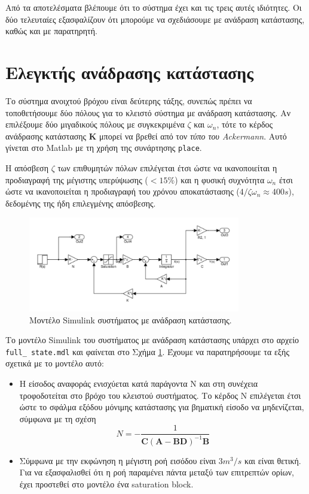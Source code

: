 \documentclass[a4paper, 11pt, english, greek]{article}
\begin{document}
Από τα αποτελέσματα βλέπουμε ότι το σύστημα έχει και τις τρεις αυτές ιδιότητες.
Οι δύο τελευταίες εξασφαλίζουν ότι μπορούμε να σχεδιάσουμε με ανάδραση κατάστασης, καθώς και με παρατηρητή.

\section{Ελεγκτής ανάδρασης κατάστασης}
Το σύστημα ανοιχτού βρόχου είναι δεύτερης τάξης, συνεπώς πρέπει να τοποθετήσουμε δύο πόλους για το κλειστό
σύστημα με ανάδραση κατάστασης.
Αν επιλέξουμε δύο μιγαδικούς πόλους με συγκεκριμένα $\zeta$ και $ω_n$, τότε το κέρδος ανάδρασης κατάστασης $\mathbf{K}$
μπορεί να βρεθεί από τον \emph{τύπο του \textlatin{Ackermann}}.
Αυτό γίνεται στο \textlatin{Matlab} με τη χρήση της συνάρτησης \textlatin{\texttt{place}}.

Η απόσβεση $\zeta$ των επιθυμητών πόλων επιλέγεται έτσι ώστε να ικανοποιείται η προδιαγραφή της μέγιστης υπερύψωσης
($<15\%$) και η φυσική συχνότητα $ω_n$ έτσι ώστε να ικανοποιείται η προδιαγραφή του χρόνου αποκατάστασης
($4/\zeta ω_n\approx 400s$), δεδομένης της ήδη επιλεγμένης απόσβεσης.

\begin{figure}[htb]
  \centering
  \includegraphics[width=350px]{full_state}
  \caption{Μοντέλο \textlatin{Simulink} συστήματος με ανάδραση κατάστασης.}
  \label{fig:full_state}
\end{figure}

Το μοντέλο \textlatin{Simulink} του συστήματος με ανάδραση κατάστασης υπάρχει στο αρχείο
\textlatin{\texttt{full\_ state.mdl}} και φαίνεται στο Σχήμα \ref{fig:full_state}.
Έχουμε να παρατηρήσουμε τα εξής σχετικά με το μοντέλο αυτό:
\begin{itemize}
	\item Η είσοδος αναφοράς ενισχύεται κατά παράγοντα Ν και στη συνέχεια τροφοδοτείται στο βρόχο του κλειστού συστήματος.
	      Το κέρδος Ν επιλέγεται έτσι ώστε το σφάλμα εξόδου μόνιμης κατάστασης για βηματική είσοδο να μηδενίζεται,
	      σύμφωνα με τη σχέση
	      \begin{equation}
	      	\label{eq:ref_gain}
	      	N = -\frac{\displaystyle 1}{\mathbf{C}(\mathbf{A}-\mathbf{B}\mathbf{D})^{-1} \mathbf{B}}
	      \end{equation}
	\item Σύμφωνα με την εκφώνηση η μέγιστη ροή εισόδου είναι $3 m^3/s$ και είναι θετική.
	      Για να εξασφαλισθεί ότι η ροή παραμένει πάντα μεταξύ των επιτρεπτών ορίων, έχει προστεθεί στο μοντέλο
	      ένα \textlatin{saturation block}.
\end{itemize}
\end{document}
